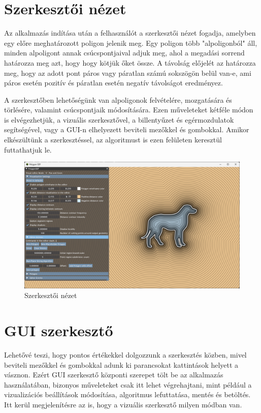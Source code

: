\section{Szerkesztői nézet}

Az alkalmazás indítása után a felhasználót a szerkesztői nézet fogadja, amelyben egy előre meghatározott poligon jelenik meg. Egy poligon több "alpoligonból" áll, minden alpoligont annak csúcspontjaival adjuk meg, ahol a megadási sorrend határozza meg azt, hogy hogy kötjük őket össze. A távolság előjelét az határozza meg, hogy az adott pont páros vagy páratlan számú sokszögön belül van-e, ami páros esetén pozitív és páratlan esetén negatív távolságot eredményez.

A szerkesztőben lehetőségünk van alpoligonok felvételére, mozgatására és törlésére, valamint csúcspontjaik módosítására. Ezen műveleteket kétféle módon is elvégezhetjük, a vizuális szerkesztővel, a billentyűzet és egérmozdulatok segítségével, vagy a GUI-n elhelyezett beviteli mezőkkel és gombokkal. Amikor elkészültünk a szerkesztéssel, az algoritmust is ezen felületen keresztül futtathatjuk le.

\begin{figure}[H]
    \centering
    \includegraphics[width=1\linewidth]{images/editor.png}
    \caption{Szerkesztői nézet}
    \label{fig:editor-1}
\end{figure}

\section{GUI szerkesztő}

Lehetővé teszi, hogy pontos értékekkel dolgozzunk a szerkesztés közben, mivel beviteli mezőkkel és gombokkal adunk ki parancsokat kattintások helyett a vásznon.
Ezért GUI szerkesztő központi szerepet tölt be az alkalmazás használatában, bizonyos műveleteket csak itt lehet végrehajtani, mint például a vizualizációs beállítások módosítása, algoritmus lefuttatása, mentés és betöltés. Itt kerül megjelenítésre az is, hogy a vizuális szerkesztő milyen módban van.

